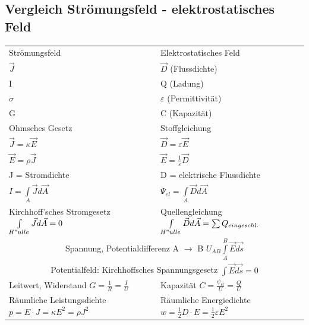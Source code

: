 \subsection{Vergleich Strömungsfeld - elektrostatisches Feld}
\begin{tabular}{ll}
Strömungsfeld & Elektrostatisches Feld\\
$ \vec{J} $ & $ \vec{D} $ (Flussdichte) \\
I & Q (Ladung)\\
$ \sigma $ & $ \varepsilon $ (Permittivität) \\

G & C (Kapazität) \\

Ohmsches Gesetz & Stoffgleichung \\

$ \vec J = \kappa \vec E $ & $ \vec D = \varepsilon \vec E $ \\

$ \vec E = \rho \vec J $ & $ \vec E = \frac{1}{\varepsilon} \vec D $ \\

J = Stromdichte & D = elektrische Flussdichte \\

$I = \int\limits_{A} \vec J d \vec A$ & $ \Psi_{el} = \int\limits_{A} \vec D d \vec A $ \\

Kirchhoff'sches Stromgesetz$ \int\limits_{H"ulle} \vec J d \vec A = 0$ & Quellengleichung $ \int\limits_{H"ulle} \vec D d \vec A = \sum Q_{eingeschl.}$\\

\multicolumn{2}{c}{Spannung, Potentialdifferenz A $\rightarrow$ B  $U_{AB} \int\limits_{A}^B \vec E \vec{ds}$} \\

\multicolumn{2}{c}{Potentialfeld: Kirchhoffsches Spannungsgesetz $\int \vec E \vec{ds} = 0 $} \\

Leitwert, Widerstand $ G = \frac{1}{R} = \frac{I}{U} $ & Kapazität $ C = \frac{\psi_{el}}{U} = \frac{Q}{U} $ \\

Räumliche Leistungsdichte $ p = E \cdot J = \kappa E^2 = \rho J^2 $ & Räumliche Energiedichte $ w = \frac{1}{2} D \cdot E = \frac{1}{2} \varepsilon E^2 $ \\
\end{tabular}

